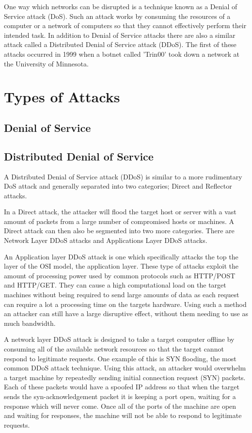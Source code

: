 \documentclass[conference, a4paper]{IEEEtran}
\begin{document}
    One way which networks can be disrupted is a technique known as a Denial of Service attack (DoS).
    Such an attack works by consuming the resources of a computer or a network of computers so that they cannot effectively perform their intended task.
    In addition to Denial of Service attacks there are also a similar attack called a Distributed Denial of Service attack (DDoS).
    The first of these attacks occurred in 1999 when a botnet called 'Trin00' took down a network at the University of Minnesota. \cite{CERT_DDOS}

\section{Types of Attacks}
\subsection{Denial of Service}
\subsection{Distributed Denial of Service}
    A Distributed Denial of Service attack (DDoS) is similar to a more rudimentary DoS attack and generally separated into two categories; Direct and Reflector attacks.

    In a Direct attack, the attacker will flood the target host or server with a vast amount of packets from a large number of compromised hosts or machines.
    A Direct attack can then also be segmented into two more categories. There are Network Layer DDoS attacks and Applications Layer DDoS attacks.\cite{empirical_evaluation}

    An Application layer DDoS attack is one which specifically attacks the top the layer of the OSI model, the application layer.
    These type of attacks exploit the amount of processing power used by common protocols such as HTTP/POST and HTTP/GET.
    They can cause a high computational load on the target machines without being required to send large amounts of data as each request can require a lot a processing time on the targets hardware.
    Using such a method an attacker can still have a large disruptive effect, without them needing to use as much bandwidth.\cite{cloudflare_DDoS}

    A network layer DDoS attack is designed to take a target computer offline by consuming all of the available network resources so that the target cannot respond to legitimate requests.
    One example of this is SYN flooding, the most common DDoS attack technique. \cite{chnage_point_monitoring} Using this attack, an attacker would overwhelm a target machine by repeatedly sending initial connection request (SYN) packets.
    Each of these packets would have a spoofed IP address so that when the target sends the syn-acknowledgement packet it is keeping a port open, waiting for a response which will never come.
    Once all of the ports of the machine are open and waiting for responses, the machine will not be able to respond to legitimate requests.\cite{cloudflare_syn_flood}
\end{document}
